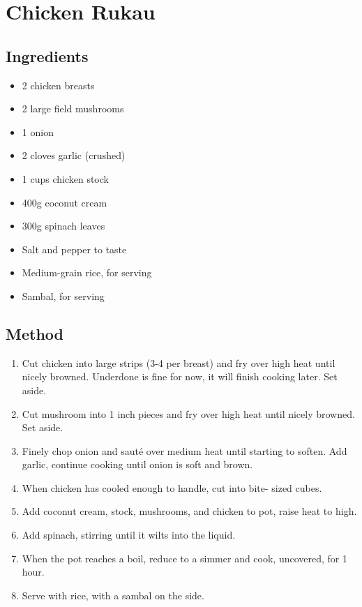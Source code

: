 \clearpage
\section{Chicken Rukau}


\subsection{Ingredients}

\begin{itemize}
    \item 2 chicken breasts
    \item 2 large field mushrooms
    \item 1 onion
    \item 2 cloves garlic (crushed)
    \item 1 cups chicken stock
    \item 400g coconut cream
    \item 300g spinach leaves
    \item Salt and pepper to taste
    \item Medium-grain rice, for serving
    \item Sambal, for serving
\end{itemize}

\subsection{Method}

\begin{enumerate}
    \item Cut chicken into large strips (3-4 per breast) and fry over
    high heat until nicely browned. Underdone is fine for now, it
    will finish cooking later. Set aside.
    \item Cut mushroom into 1 inch pieces and fry over high heat until
    nicely browned. Set aside.
    \item Finely chop onion and sauté over medium heat until starting
    to soften. Add garlic, continue cooking until onion is soft and
    brown.
    \item When chicken has cooled enough to handle, cut into bite-
    sized cubes.
    \item Add coconut cream, stock, mushrooms, and chicken to pot,
    raise heat to high.
    \item Add spinach, stirring until it wilts into the liquid.
    \item When the pot reaches a boil, reduce to a simmer and cook,
    uncovered, for 1 hour.
    \item Serve with rice, with a sambal on the side.
\end{enumerate}
